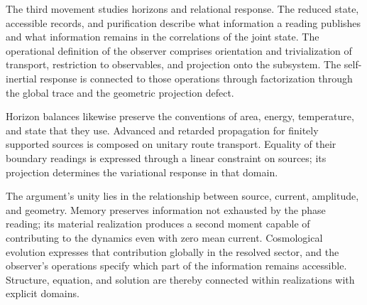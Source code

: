 The third movement studies horizons and relational response. The reduced
state, accessible records, and purification describe
what information a reading publishes and what information remains in
the correlations of the joint state. The operational definition of the
observer comprises orientation and trivialization of transport,
restriction to observables, and projection onto the subsystem. The
self-inertial response is connected to those operations through factorization
through the global trace and the geometric projection defect.

Horizon balances likewise preserve the conventions of
area, energy, temperature, and state that they use.
Advanced and retarded propagation for finitely supported sources is
composed on unitary route transport. Equality of their boundary readings is
expressed through a linear constraint on sources; its projection
determines the variational response in that domain.

The argument's unity lies in the relationship between source, current,
amplitude, and geometry. Memory preserves information not exhausted by
the phase reading; its material realization produces a second moment
capable of contributing to the dynamics even with zero mean current.
Cosmological evolution expresses that contribution globally in the
resolved sector, and the observer's operations specify which part of the
information remains accessible. Structure, equation, and solution are
thereby connected within realizations with explicit domains.
